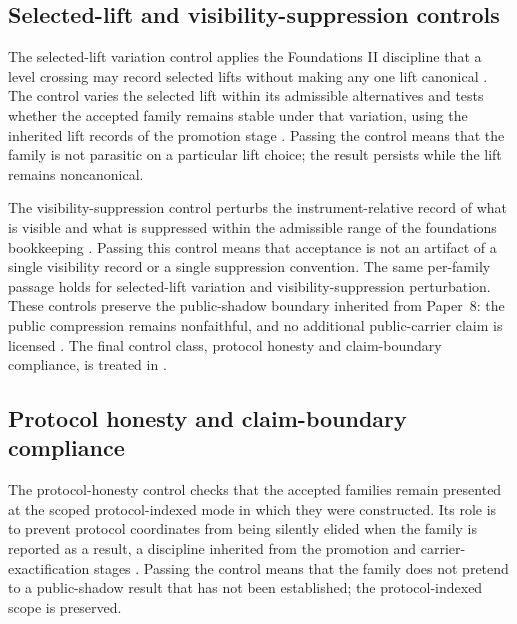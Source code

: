 \documentclass[11pt]{article}
\newcommand{\PaperEight}{Paper~8}
\theoremstyle{definition}
\begin{document}
\subsection{Selected-lift and visibility-suppression controls}\label{subsec:selected-lift-visibility-controls}

The selected-lift variation control applies the Foundations II discipline that
a level crossing may record selected lifts without making any one lift
canonical \cite{Tsiokos2026FoundationsII}.  The control varies the selected lift
within its admissible alternatives and tests whether the accepted family remains
stable under that variation, using the inherited lift records of the promotion
stage \cite{Tsiokos2026PromotionCriteria}.  Passing the control means that the
family is not parasitic on a particular lift choice; the result persists while
the lift remains noncanonical.

The visibility-suppression control perturbs the instrument-relative record of
what is visible and what is suppressed within the admissible range of the
foundations bookkeeping \cite{Tsiokos2026FoundationsII}.  Passing this control
means that acceptance is not an artifact of a single visibility record or a
single suppression convention.  The same per-family passage holds for
selected-lift variation and visibility-suppression perturbation.  These
controls preserve the public-shadow boundary inherited from \PaperEight{}: the
public compression remains nonfaithful, and no additional public-carrier claim
is licensed
\cite{Tsiokos2026CarrierToEvent}.  The final control class, protocol honesty and
claim-boundary compliance, is treated in
.

\subsection{Protocol honesty and claim-boundary compliance}\label{subsec:protocol-honesty-claim-boundary}

The protocol-honesty control checks that the accepted families remain presented
at the scoped protocol-indexed mode in which they were constructed.  Its role is
to prevent protocol coordinates from being silently elided when the family is
reported as a result, a discipline inherited from the promotion and
carrier-exactification stages
\cite{Tsiokos2026PromotionCriteria,Tsiokos2026CarrierExactification}.  Passing
the control means that the family does not pretend to a public-shadow result
that has not been established; the protocol-indexed scope is preserved.
\end{document}
